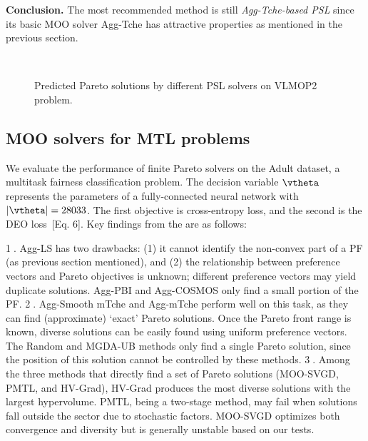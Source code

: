 \textbf{Conclusion.} The most recommended method is still \emph{Agg-Tche-based PSL} since its basic MOO solver Agg-Tche has attractive properties as mentioned in the previous section. 

\begin{figure}%
    \centering%
    \\
    \caption{Predicted Pareto solutions by different PSL solvers on VLMOP2 problem.} \label{fig:psl_synthetic}
\end{figure}

\subsection{MOO solvers for MTL problems}
We evaluate the performance of finite Pareto solvers on the Adult dataset, a multitask fairness classification problem. The decision variable $\vtheta$ represents the parameters of a fully-connected neural network with $|\vtheta|=28033$. The first objective is cross-entropy loss, and the second is the DEO loss~\cite{ruchte2021scalable}[Eq. 6]. Key findings from the  are as follows:

\textcircled{1}. Agg-LS has two drawbacks: (1) it cannot identify the non-convex part of a PF (as previous section mentioned), and (2) the relationship between preference vectors and Pareto objectives is unknown; different preference vectors may yield duplicate solutions. Agg-PBI and Agg-COSMOS only find a small portion of the PF. 
\textcircled{2}. Agg-Smooth mTche and Agg-mTche perform well on this task, as they can find (approximate) `exact' Pareto solutions. Once the Pareto front range is known, diverse solutions can be easily found using uniform preference vectors. The Random and MGDA-UB methods only find a single Pareto solution, since the position of this solution cannot be controlled by these methods. 
\textcircled{3}. Among the three methods that directly find a set of Pareto solutions (MOO-SVGD, PMTL, and HV-Grad), HV-Grad produces the most diverse solutions with the largest hypervolume. PMTL, being a two-stage method, may fail when solutions fall outside the sector due to stochastic factors. MOO-SVGD optimizes both convergence and diversity but is generally unstable based on our tests.

